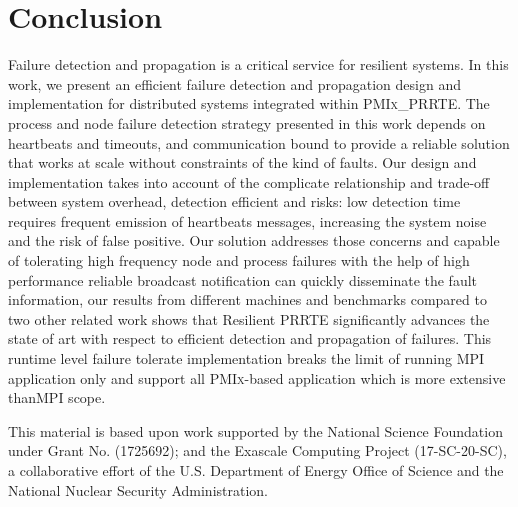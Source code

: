 \documentclass[sigconf]{acmart}
\newcommand{\prrte}[0]{\textsc{PRRTE}\xspace}
\newcommand{\pmix}[0]{\textsc{PMIx}\xspace}
\newcommand{\mpi}[0]{\textsc{MPI}\xspace}
\begin{document}
\section{Conclusion}\label{sec:conclusion}
Failure detection and propagation is a critical service for resilient systems. In this work, we present an efficient failure detection and propagation design and implementation for distributed systems integrated within \pmix\_\prrte. The process and node failure detection strategy presented in this work depends on heartbeats and timeouts, and communication bound to provide a reliable solution that works at scale without constraints of the kind of faults. Our design and implementation takes into account of the complicate relationship and trade-off between system overhead, detection efficient and risks: low detection time requires frequent emission of heartbeats messages, increasing the system noise and the risk of false positive. Our solution addresses those concerns and capable of tolerating high frequency node and process failures with the help of high performance reliable broadcast notification can quickly disseminate the fault information, our results from different machines and benchmarks compared to two other related work shows that Resilient \prrte significantly advances the state of art with respect to efficient detection and propagation of failures. This runtime level failure tolerate implementation breaks the limit of running \mpi  application only and support all \pmix-based application which is more extensive than\mpi scope.   


%
\begin{acks}
This material is based upon work supported by the National Science Foundation under Grant No. (1725692); and the Exascale Computing Project (17-SC-20-SC), a collaborative effort of the 
U.S. Department of Energy Office of Science and the National Nuclear Security Administration.    
\end{acks}

%


\end{document}
